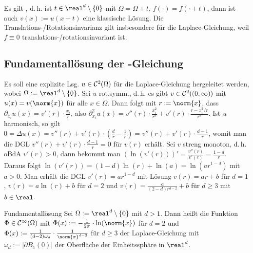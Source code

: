 \begin{Bem}
    Es gilt , d.\,h. ist
    $t \in \real^d \setminus \{0\}$ mit $\Omega = \Omega + t$, $f(\cdot) = f(\cdot + t)$,
    dann ist auch $v(x) := u(x + t)$ eine klassische Lösung.
    Die Translations-/Rotationsinvarianz gilt insbesondere für die Laplace-Gleichung,
    weil $f \equiv 0$ translations-/rotationsinvariant ist.
\end{Bem}

\subsection{%
    Fundamentallösung der -Gleichung%
}

\begin{Bem}
    Es soll eine explizite Lsg. $u \in \mathcal{C}^2(\Omega)$
    für die Laplace-Gleichung hergeleitet werden, wobei $\Omega := \real^d \setminus \{0\}$.
    Sei $u$ rot.symm., d.\,h. es gibt $v \in \mathcal{C}^2((0, \infty))$ mit
    $u(x) = v(\norm{x})$ für alle $x \in \Omega$.
    Dann folgt mit $r := \norm{x}$, dass
    $\partial_{x_i} u(x) = v'(r) \cdot \frac{x_i}{r}$,
    also $\partial_{x_i}^2 u(x) =
    v''(r) \cdot \frac{x_i^2}{r^2} + v'(r) \cdot \frac{r - x_i^2/r}{r^2}$.
    Ist $u$ harmonisch, so gilt
    $0 = \Delta u(x) =
    v''(r) + v'(r) \cdot \left(\frac{d}{r} - \frac{1}{r}\right)
    = v''(r) + v'(r) \cdot \frac{d-1}{r}$,
    womit man die DGL $v''(r) + v'(r) \cdot \frac{d-1}{r} = 0$ für $v(r)$ erhält.
    Sei $v$ streng monoton, d.\,h. oBdA $v'(r) > 0$, dann bekommt man
    $(\ln(v'(r)))' = \frac{v''(r)}{v'(r)} = \frac{1-d}{r}$.
    Daraus folgt $\ln(v'(r)) = (1 - d)\ln(r) + \ln(a) = \ln(ar^{1-d})$
    mit $a > 0$.
    Man erhält die DGL $v'(r) = ar^{1-d}$ mit Lösung
    $v(r) = ar + b$ für $d = 1$,
    $v(r) = a\ln(r) + b$ für $d = 2$ und
    $v(r) = \frac{a}{(2-d) r^{d-2}} + b$ für $d \ge 3$ mit $b \in \real$.
\end{Bem}

\linie

\begin{Def}{Fundamentallösung}
    Sei $\Omega := \real^d \setminus \{0\}$ mit $d > 1$.
    Dann heißt die Funktion $\Phi \in \mathcal{C}^\infty(\Omega)$ mit
    $\Phi(x) := -\frac{1}{2\pi} \cdot \ln(\norm{x})$ für $d = 2$ und
    $\Phi(x) := \frac{1}{(d-2)\omega_d} \cdot \frac{1}{\norm{x}^{d-2}}$ für $d \ge 3$
     der Laplace-Gleichung
    mit $\omega_d := |\partial B_1(0)|$ der Oberfläche der Einheitssphäre in $\real^d$.
\end{Def}

